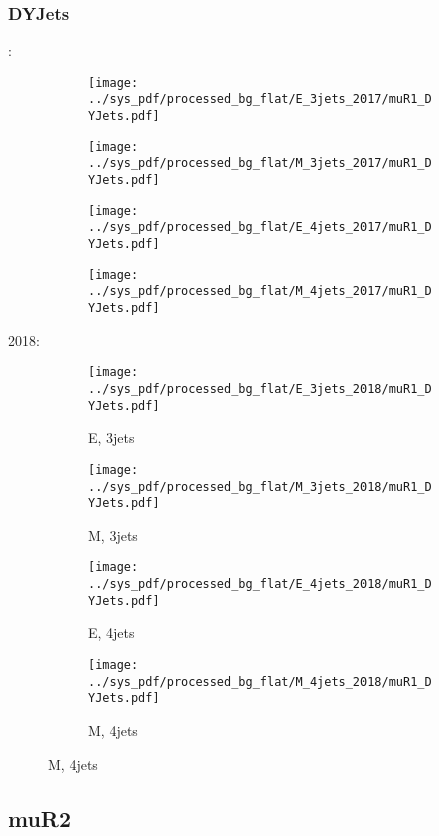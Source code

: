 \documentclass{beamer}
\begin{document}
\begin{frame}
\frametitle{DYJets}
\fontsize{5}{1}:
\begin{figure}
\centering
\begin{subfigure}[b]{0.24\textwidth}
\texttt{[image: ../sys\_pdf/processed\_bg\_flat/E\_3jets\_2017/muR1\_DYJets.pdf]}
\end{subfigure}
\begin{subfigure}[b]{0.24\textwidth}
\texttt{[image: ../sys\_pdf/processed\_bg\_flat/M\_3jets\_2017/muR1\_DYJets.pdf]}
\end{subfigure}
\begin{subfigure}[b]{0.24\textwidth}
\texttt{[image: ../sys\_pdf/processed\_bg\_flat/E\_4jets\_2017/muR1\_DYJets.pdf]}
\end{subfigure}
\begin{subfigure}[b]{0.24\textwidth}
\texttt{[image: ../sys\_pdf/processed\_bg\_flat/M\_4jets\_2017/muR1\_DYJets.pdf]}
\end{subfigure}
\end{figure}
2018:
\begin{figure}
\centering
\begin{subfigure}[b]{0.24\textwidth}
\texttt{[image: ../sys\_pdf/processed\_bg\_flat/E\_3jets\_2018/muR1\_DYJets.pdf]}
\captionsetup{font=tiny}
\caption{E, 3jets}
\end{subfigure}
\begin{subfigure}[b]{0.24\textwidth}
\texttt{[image: ../sys\_pdf/processed\_bg\_flat/M\_3jets\_2018/muR1\_DYJets.pdf]}
\captionsetup{font=tiny}
\caption{M, 3jets}
\end{subfigure}
\begin{subfigure}[b]{0.24\textwidth}
\texttt{[image: ../sys\_pdf/processed\_bg\_flat/E\_4jets\_2018/muR1\_DYJets.pdf]}
\captionsetup{font=tiny}
\caption{E, 4jets}
\end{subfigure}
\begin{subfigure}[b]{0.24\textwidth}
\texttt{[image: ../sys\_pdf/processed\_bg\_flat/M\_4jets\_2018/muR1\_DYJets.pdf]}
\captionsetup{font=tiny}
\caption{M, 4jets}
\end{subfigure}
\end{figure}
\end{frame}


\subsection{muR2}
\end{document}
